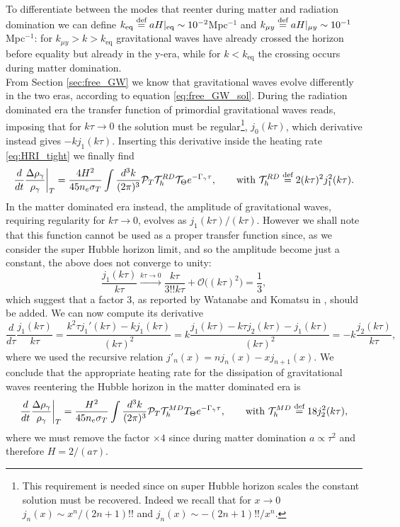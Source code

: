 To differentiate between the modes that reenter during matter and radiation domination we can define $k_\text{eq}\stackrel{\text{def}}{=} aH|_\text{eq}\sim 10^{-2}$Mpc$^{-1}$ and $k_{\mu y}\stackrel{\text{def}}{=} aH|_{\mu y}\sim 10^{-1}$Mpc$^{-1}$: for $k_{\mu y}>k>k_\text{eq}$ gravitational waves have already crossed the horizon before equality but already in the y-era, while for $k<k_\text{eq}$ the crossing occurs during matter domination.\\ From Section \ref{sec:free_GW} we know that gravitational waves evolve differently in the two eras, according to equation \eqref{eq:free_GW_sol}. During the radiation dominated era the transfer function of primordial gravitational waves reads, imposing that for $k\tau\to0$ the solution must be regular\footnote{This requirement is needed since on super Hubble horizon scales the constant solution must be recovered. Indeed we recall that for $x\to0$ $j_n(x)\sim x^{n}/(2n+1)!!$ and $j_n(x)\sim -(2n+1)!!/x^{n}$.}, $ j_0(k\tau)$, which derivative
instead gives $-kj_1(k\tau)$. Inserting this derivative inside the heating rate \eqref{eq:HRI_tight} we finally find
\begin{equation}
    \frac{d}{dt}\frac{\Delta\rho_\gamma}{\rho_\gamma}\bigg|_T=\frac{4H^2}{45n_e\sigma_T}\int\frac{d^3k}{(2\pi)^3}\mathcal{P}_T\mathcal{T}_h^{RD}\mathcal T_\Theta e^{-\Gamma_\gamma\tau},\qquad\text{with }\mathcal{T}_h^{RD}\stackrel{\text{def}}{=} 2(k\tau)^2j_1^2(k\tau).
\end{equation} 
In the matter dominated era instead, the amplitude of gravitational waves, requiring regularity for $k\tau\to0$, evolves as $j_1(k\tau)/(k\tau)$.
However we shall note that this function cannot be used as a proper transfer function since, as we consider the super Hubble horizon limit, and so the amplitude become just a constant, the above does not converge to unity:
$$\frac{j_1(k\tau)}{k\tau}\xrightarrow{k\tau\to0}\frac{k\tau}{3!!k\tau}+\mathcal{O}\big((k\tau)^2\big)=\frac{1}{3},$$
which suggest that a factor $3$, as reported by Watanabe and Komatsu in \cite{Watanabe_2006}, should be added.  
We can now compute its derivative
$$\frac{d}{d\tau}\frac{j_1(k\tau)}{k\tau}=\frac{k^2\tau j_1'(k\tau)-kj_1(k\tau)}{(k\tau)^2}=k\frac{j_1(k\tau)-k\tau j_2(k\tau)-j_1(k\tau)}{(k\tau)^2}=-k \frac{j_2(k\tau)}{k\tau},$$
where we used the recursive relation $j'_n(x)=n j_n(x)-xj_{n+1}(x)$. We conclude that the appropriate heating rate for the dissipation of gravitational waves reentering the Hubble horizon in the matter dominated era is 
\begin{equation}
    \frac{d}{dt}\frac{\Delta\rho_\gamma}{\rho_\gamma}\bigg|_T=\frac{H^2}{45n_e\sigma_T}\int\frac{d^3k}{(2\pi)^3}\mathcal{P}_T\mathcal{T}_h^{MD}T_\Theta e^{-\Gamma_\gamma\tau},\qquad\text{with }\mathcal{T}_h^{MD}\stackrel{\text{def}}{=} 18j_2^2(k\tau),
\end{equation}
where we must remove the factor $\times 4$ since during matter domination $a\propto \tau^2$ and therefore $H=2/(a\tau)$.
